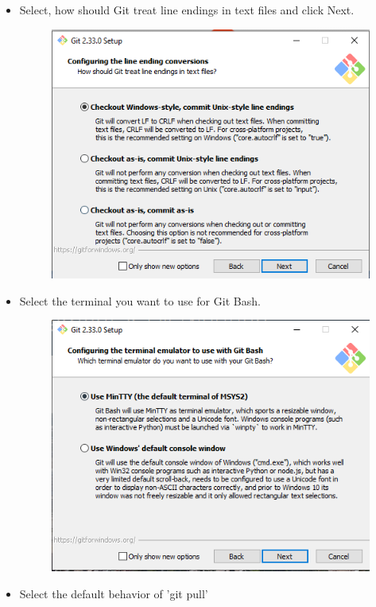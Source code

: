\documentclass[10pt]{article} %
\begin{document}
\begin{itemize}
  \item Select, how should Git treat line endings in text files and click Next.

  \begin{figure}[h!]
    \centering
    \includegraphics[width=0.7\linewidth]{figs/GitBash7}
    \caption{}
    \label{fig:gitbash7}
  \end{figure}

  \pagebreak

  \item Select the terminal you want to use for Git Bash.

  \begin{figure}[h!]
    \centering
    \includegraphics[width=0.7\linewidth]{figs/GitBash8}
    \caption{}
    \label{fig:gitbash8}
  \end{figure}

  \item Select the default behavior of 'git pull'


\end{itemize}
\end{document}
